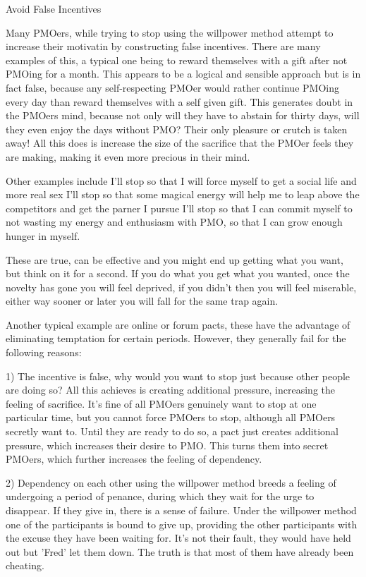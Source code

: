 Avoid False Incentives

Many PMOers, while trying to stop using the willpower method attempt to increase their motivatin by constructing false incentives. There are many examples of this, a typical one being to reward themselves with a gift after not PMOing for a month. This appears to be a logical and sensible approach but is in fact false, because any self-respecting PMOer would rather continue PMOing every day than reward themselves with a self given gift. This generates doubt in the PMOers mind, because not only will they have to abstain for thirty days, will they even enjoy the days without PMO? Their only pleasure or crutch is taken away! All this does is increase the size of the sacrifice that the PMOer feels they are making, making it even more precious in their mind.

Other examples include
  I'll stop so that I will force myself to get a social life and more real sex
  I'll stop so that some magical energy will help me to leap above the competitors and get the parner I pursue
  I'll stop so that I can commit myself to not wasting my energy and enthusiasm with PMO, so that I can grow enough hunger in myself.

These are true, can be effective and you might end up getting what you want, but think on it for a second. If you do what you get what you wanted, once the novelty has gone you will feel deprived, if you didn't then you will feel miserable, either way sooner or later you will fall for the same trap again.

Another typical example are online or forum pacts, these have the advantage of eliminating temptation for certain periods. However, they generally fail for the following reasons:

  1) The incentive is false, why would you want to stop just because other people are doing so? All this achieves is creating additional pressure, increasing the feeling of sacrifice. It's fine of all PMOers genuinely want to stop at one particular time, but you cannot force PMOers to stop, although all PMOers secretly want to. Until they are ready to do so, a pact just creates additional pressure, which increases their desire to PMO. This turns them into secret PMOers, which further increases the feeling of dependency.

  2) Dependency on each other using the willpower method breeds a feeling of undergoing a period of penance, during which they wait for the urge to disappear. If they give in, there is a sense of failure. Under the willpower method one of the participants is bound to give up, providing the other participants with the excuse they have been waiting for. It's not their fault, they would have held out but 'Fred' let them down. The truth is that most of them have already been cheating.

